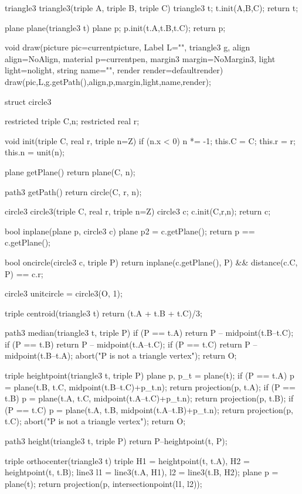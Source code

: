triangle3 triangle3(triple A, triple B, triple C) {
	triangle3 t;
  	t.init(A,B,C);
  	return t;
}

plane plane(triangle3 t) {
	plane p; p.init(t.A,t.B,t.C);
  	return p;
}

void draw(picture pic=currentpicture, Label L="", triangle3 g, align align=NoAlign, material p=currentpen, margin3 margin=NoMargin3, light light=nolight, string name="", render render=defaultrender) {
  draw(pic,L,g.getPath(),align,p,margin,light,name,render);
}


struct circle3 {
	restricted triple C,n;
  	restricted real r;
  
	void init(triple C, real r, triple n=Z) {
      	if (n.x < 0) n *= -1;
    	this.C = C;
      	this.r = r;
      	this.n = unit(n);
    }
  
  	plane getPlane() {
    	return plane(C, n);
    }
  
  	path3 getPath() {
    	return circle(C, r, n);
    }
}

circle3 circle3(triple C, real r, triple n=Z) {
	circle3 c;
  	c.init(C,r,n);
  	return c;
}

bool inplane(plane p, circle3 c) {
  	plane p2 = c.getPlane();
	return p == c.getPlane();
}

bool oncircle(circle3 c, triple P) {
	return inplane(c.getPlane(), P) && distance(c.C, P) == c.r;
}

circle3 unitcircle = circle3(O, 1);

triple centroid(triangle3 t) {
	return (t.A + t.B + t.C)/3;
}

path3 median(triangle3 t, triple P) {
	if (P == t.A) {
    	return P -- midpoint(t.B--t.C);
    }
  	if (P == t.B) {
    	return P -- midpoint(t.A--t.C);
    }
  	if (P == t.C) {
    	return P -- midpoint(t.B--t.A);
    }
  	abort("P is not a triangle vertex");
  	return O;
}

triple heightpoint(triangle3 t, triple P) {
  	plane p, p_t = plane(t);
	if (P == t.A) {
    	p = plane(t.B, t.C, midpoint(t.B--t.C)+p_t.n);
      	return projection(p, t.A);
    }
  	if (P == t.B) {
    	p = plane(t.A, t.C, midpoint(t.A--t.C)+p_t.n);
      	return projection(p, t.B);
    }
  	if (P == t.C) {
    	p = plane(t.A, t.B, midpoint(t.A--t.B)+p_t.n);
      	return projection(p, t.C);
    }
  	abort("P is not a triangle vertex");
  	return O;
}

path3 height(triangle3 t, triple P) {
	return P--heightpoint(t, P);
}

triple orthocenter(triangle3 t) {
	triple H1 = heightpoint(t, t.A), H2 = heightpoint(t, t.B);
  	line3 l1 = line3(t.A, H1), l2 = line3(t.B, H2);
  	plane p = plane(t);
  	return projection(p, intersectionpoint(l1, l2));
}

